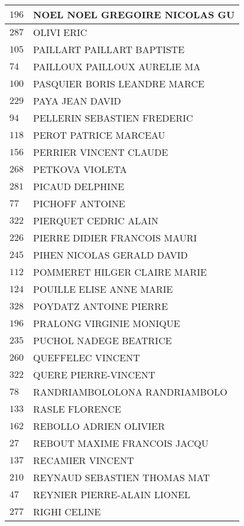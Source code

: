 \begin{xltabular}{\linewidth}{|l|X|}
    \hline
    $196$ & NOEL NOEL GREGOIRE NICOLAS GU \\
    \hline
    $287$ & OLIVI ERIC \\
    \hline
    $105$ & PAILLART PAILLART BAPTISTE \\
    \hline
    $74$ & PAILLOUX PAILLOUX AURELIE MA \\
    \hline
    $100$ & PASQUIER BORIS LEANDRE MARCE \\
    \hline
    $229$ & PAYA JEAN DAVID \\
    \hline
    $94$ & PELLERIN SEBASTIEN FREDERIC \\
    \hline
    $118$ & PEROT PATRICE MARCEAU \\
    \hline
    $156$ & PERRIER VINCENT CLAUDE \\
    \hline
    $268$ & PETKOVA VIOLETA \\
    \hline
    $281$ & PICAUD DELPHINE \\
    \hline
    $77$ & PICHOFF ANTOINE \\
    \hline
    $322$ & PIERQUET CEDRIC ALAIN \\
    \hline
    $226$ & PIERRE DIDIER FRANCOIS MAURI \\
    \hline
    $245$ & PIHEN NICOLAS GERALD DAVID \\
    \hline
    $112$ & POMMERET HILGER CLAIRE MARIE \\
    \hline
    $124$ & POUILLE ELISE ANNE MARIE \\
    \hline
    $328$ & POYDATZ ANTOINE PIERRE \\
    \hline
    $196$ & PRALONG VIRGINIE MONIQUE \\
    \hline
    $235$ & PUCHOL NADEGE BEATRICE \\
    \hline
    $260$ & QUEFFELEC VINCENT \\
    \hline
    $322$ & QUERE PIERRE-VINCENT \\
    \hline
    $78$ & RANDRIAMBOLOLONA RANDRIAMBOLO \\
    \hline
    $133$ & RASLE FLORENCE \\
    \hline
    $162$ & REBOLLO ADRIEN OLIVIER \\
    \hline
    $27$ & REBOUT MAXIME FRANCOIS JACQU \\
    \hline
    $137$ & RECAMIER VINCENT \\
    \hline
    $210$ & REYNAUD SEBASTIEN THOMAS MAT \\
    \hline
    $47$ & REYNIER PIERRE-ALAIN LIONEL \\
    \hline
    $277$ & RIGHI CELINE \\

\end{xltabular}
